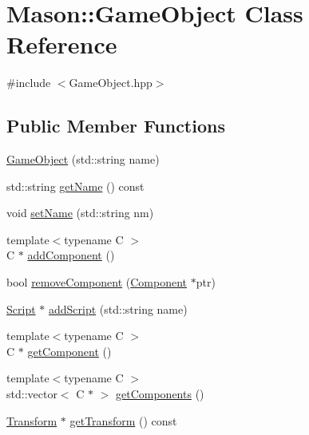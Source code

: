 \hypertarget{class_mason_1_1_game_object}{}\section{Mason\+:\+:Game\+Object Class Reference}
\label{class_mason_1_1_game_object}


{\ttfamily \#include $<$Game\+Object.\+hpp$>$}

\subsection*{Public Member Functions}
\begin{DoxyCompactItemize}
\item 
\hyperlink{class_mason_1_1_game_object_a0737657696b478c7962c2a6c2f5b1bd8}{Game\+Object} (std\+::string name)
\item 
std\+::string \hyperlink{class_mason_1_1_game_object_a7b5b5ca6b3754cdfb175cd1938c77f10}{get\+Name} () const
\item 
void \hyperlink{class_mason_1_1_game_object_af478034e4602956fc936ee4fbe05d107}{set\+Name} (std\+::string nm)
\item 
{\footnotesize template$<$typename C $>$ }\\C $\ast$ \hyperlink{class_mason_1_1_game_object_a081a1106a55dcb1df6e8998888dd1a10}{add\+Component} ()
\item 
bool \hyperlink{class_mason_1_1_game_object_a1c030bb5020968009a9b6c85ac0b4df8}{remove\+Component} (\hyperlink{class_mason_1_1_component}{Component} $\ast$ptr)
\item 
\hyperlink{class_mason_1_1_script}{Script} $\ast$ \hyperlink{class_mason_1_1_game_object_aecc55ed7117f6f0b940ed05e4936496f}{add\+Script} (std\+::string name)
\item 
{\footnotesize template$<$typename C $>$ }\\C $\ast$ \hyperlink{class_mason_1_1_game_object_aa5b74912ab3faf48cbc33db42ae9d0de}{get\+Component} ()
\item 
{\footnotesize template$<$typename C $>$ }\\std\+::vector$<$ C $\ast$ $>$ \hyperlink{class_mason_1_1_game_object_a0e8aabb17dd151cb5acb5d912b9316bf}{get\+Components} ()
\item 
\hyperlink{class_mason_1_1_transform}{Transform} $\ast$ \hyperlink{class_mason_1_1_game_object_a162ad1209ccc3708009ce6166021572f}{get\+Transform} () const
\end{DoxyCompactItemize}
